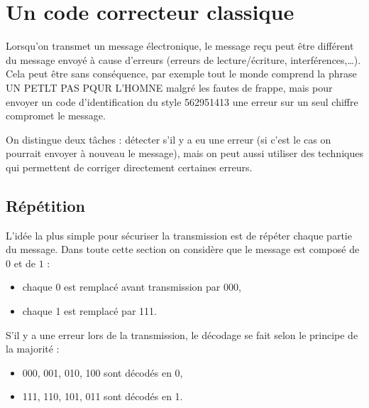 \documentclass[11pt,class=report,crop=false]{standalone}
\begin{document}







\section{Un code correcteur classique}

Lorsqu'on transmet un message électronique, le message reçu peut être différent du message envoyé à cause d'erreurs (erreurs de lecture/écriture, interférences,\ldots). Cela peut être sans conséquence, par exemple tout le monde comprend la phrase \og{}UN PETLT PAS PQUR L'HOMNE\fg{} malgré les fautes de frappe, mais pour envoyer un code d'identification du style \og{}562951413\fg{} une erreur sur un seul chiffre compromet le message.

On distingue deux tâches : détecter s'il y a eu une erreur (si c'est le cas on pourrait envoyer à nouveau le message), mais on peut aussi utiliser des techniques qui permettent de corriger directement certaines erreurs.

\subsection{Répétition}

L'idée la plus simple pour sécuriser la transmission est de répéter chaque partie du message.
Dans toute cette section on considère que le message est composé de $0$ et de $1$ :
\begin{itemize}
  \item chaque \og{}0\fg{} est remplacé avant transmission par \og{}000\fg{},
  \item chaque \og{}1\fg{} est remplacé par \og{}111\fg{}.
\end{itemize}

S'il y a une erreur lors de la transmission, le décodage se fait selon le principe de la majorité :
\begin{itemize}
  \item 000, 001, 010, 100 sont décodés en \og{}0\fg{},
  \item 111, 110, 101, 011 sont décodés en \og{}1\fg{}.
\end{itemize}
\end{document}
